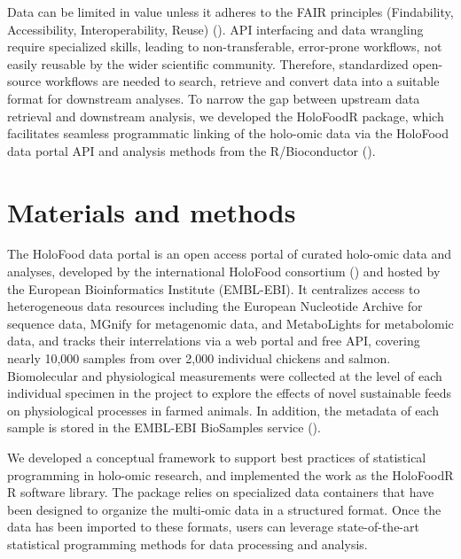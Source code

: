 \documentclass[unnumsec,webpdf,namedate,modern,large]{oup-authoring-template}%
\begin{document}
Data can be limited in value unless it adheres to the FAIR principles (Findability, Accessibility, Interoperability, Reuse) (\cite{wilkinsonFAIRGuidingPrinciples2016}). API interfacing and data wrangling require specialized skills, leading to non-transferable, error-prone workflows, not easily reusable by the wider scientific community. Therefore, standardized open-source workflows are needed to search, retrieve and convert data into a suitable format for downstream analyses.
To narrow the gap between upstream data retrieval and downstream analysis, we developed the HoloFoodR package, which facilitates seamless programmatic linking of the holo-omic data via the HoloFood data portal API and analysis methods from the R/Bioconductor  (\cite{gentleman_bioconductor_2004,callahan_bioconductor_2016}).

\section{Materials and methods}

The HoloFood data portal is an open access portal of curated holo-omic data and analyses, developed by the international HoloFood consortium (\cite{rogers_holofood_2025}) and hosted by the European Bioinformatics Institute (EMBL-EBI). It centralizes access to heterogeneous data resources including the European Nucleotide Archive for sequence data, MGnify for metagenomic data, and MetaboLights for metabolomic data, and tracks their interrelations via a web portal and free API, covering nearly 10,000 samples from over 2,000 individual chickens and salmon. Biomolecular and physiological measurements were collected at the level of each individual specimen in the project to explore the effects of novel sustainable feeds on physiological processes in farmed animals. In addition, the metadata of each sample is stored in the EMBL-EBI BioSamples service (\cite{courtot_2018}).

We developed a conceptual framework to support best practices of statistical programming in holo-omic research, and implemented the work as the HoloFoodR R software library. The package relies on specialized data containers that have been designed to organize the multi-omic data in a structured format. Once the data has been imported to these formats, users can leverage state-of-the-art statistical programming methods for data processing and analysis.
\end{document}
